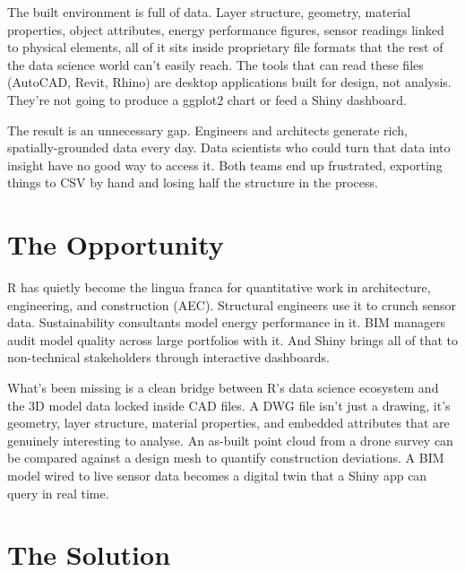 \documentclass[
  11pt,
  letterpaper,
  DIV=11,
  numbers=noendperiod]{scrreprt}
\begin{document}

The built environment is full of data. Layer structure, geometry,
material properties, object attributes, energy performance figures,
sensor readings linked to physical elements, all of it sits inside
proprietary file formats that the rest of the data science world can't
easily reach. The tools that can read these files (AutoCAD, Revit,
Rhino) are desktop applications built for design, not analysis. They're
not going to produce a ggplot2 chart or feed a Shiny dashboard.

The result is an unnecessary gap. Engineers and architects generate
rich, spatially-grounded data every day. Data scientists who could turn
that data into insight have no good way to access it. Both teams end up
frustrated, exporting things to CSV by hand and losing half the
structure in the process.

\section*{The Opportunity}\label{the-opportunity}


R has quietly become the lingua franca for quantitative work in
architecture, engineering, and construction (AEC). Structural engineers
use it to crunch sensor data. Sustainability consultants model energy
performance in it. BIM managers audit model quality across large
portfolios with it. And Shiny brings all of that to non-technical
stakeholders through interactive dashboards.

What's been missing is a clean bridge between R's data science ecosystem
and the 3D model data locked inside CAD files. A DWG file isn't just a
drawing, it's geometry, layer structure, material properties, and
embedded attributes that are genuinely interesting to analyse. An
as-built point cloud from a drone survey can be compared against a
design mesh to quantify construction deviations. A BIM model wired to
live sensor data becomes a digital twin that a Shiny app can query in
real time.

\section*{The Solution}\label{the-solution}

\end{document}
